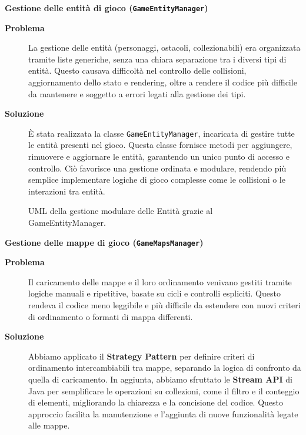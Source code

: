 \documentclass[a4paper,12pt]{report}
\begin{document}
\noindent
\textbf{Gestione delle entità di gioco (\texttt{GameEntityManager})}
\begin{description}
	\item[\textbf{Problema}]
	      La gestione delle entità (personaggi, ostacoli, collezionabili) era organizzata tramite liste generiche, senza una chiara separazione tra i diversi tipi di entità. Questo causava
	      difficoltà nel controllo delle collisioni, aggiornamento dello stato e rendering, oltre a rendere il codice più difficile da mantenere e soggetto a errori legati alla gestione dei tipi.

	\item[\textbf{Soluzione}]
	      È stata realizzata la classe \texttt{GameEntityManager}, incaricata di gestire tutte le entità presenti nel gioco. Questa classe fornisce metodi per aggiungere, rimuovere e aggiornare le
	      entità, garantendo un unico punto di accesso e controllo. Ciò favorisce una gestione ordinata e modulare, rendendo più semplice implementare logiche di gioco complesse come le collisioni o
	      le interazioni tra entità.
\end{description}
\begin{figure}[H]
	\centering{}
	
	\caption{UML della gestione modulare delle Entità grazie al GameEntityManager.}
	\label{img:GameEntityManager}
\end{figure}
\newpage
\noindent
\textbf{Gestione delle mappe di gioco (\texttt{GameMapsManager})}
\begin{description}
	\item[\textbf{Problema}]
	      Il caricamento delle mappe e il loro ordinamento venivano gestiti tramite logiche manuali e ripetitive, basate su cicli e controlli espliciti. Questo rendeva il codice meno
	      leggibile e più difficile da estendere con nuovi criteri di ordinamento o formati di mappa differenti.

	\item[\textbf{Soluzione}]
	      Abbiamo applicato il \textbf{Strategy Pattern} per definire criteri di ordinamento intercambiabili tra mappe, separando la logica di confronto da quella di caricamento. In
	      aggiunta, abbiamo sfruttato le \textbf{Stream API} di Java per semplificare le operazioni su collezioni, come il filtro e il conteggio di elementi, migliorando la chiarezza e la concisione
	      del codice. Questo approccio facilita la manutenzione e l'aggiunta di nuove funzionalità legate alle mappe.
\end{description}
\end{document}
